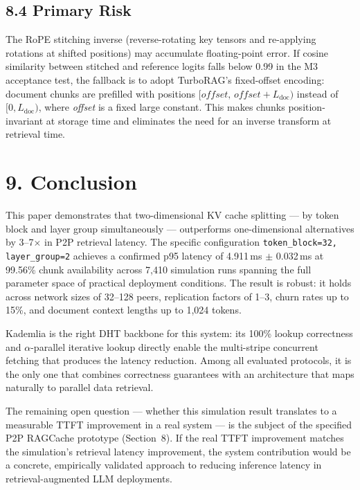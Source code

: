 \documentclass[11pt]{article}
\begin{document}
\subsection{8.4 Primary Risk}

The RoPE stitching inverse (reverse-rotating key tensors and re-applying
rotations at shifted positions) may accumulate floating-point error. If
cosine similarity between stitched and reference logits falls below 0.99
in the M3 acceptance test, the fallback is to adopt TurboRAG's
fixed-offset encoding: document chunks are prefilled with positions
$[\textit{offset},\, \textit{offset} + L_\text{doc})$ instead of
$[0, L_\text{doc})$, where \textit{offset} is a fixed large constant.
This makes chunks position-invariant at storage time and eliminates the
need for an inverse transform at retrieval time.

\section{9. Conclusion}

This paper demonstrates that two-dimensional KV cache splitting --- by
token block and layer group simultaneously --- outperforms
one-dimensional alternatives by 3--7$\times$ in P2P retrieval latency.
The specific configuration \texttt{token\_block=32, layer\_group=2}
achieves a confirmed p95 latency of 4.911\,ms $\pm$ 0.032\,ms at 99.56\%
chunk availability across 7,410 simulation runs spanning the full
parameter space of practical deployment conditions. The result is robust:
it holds across network sizes of 32--128 peers, replication factors of
1--3, churn rates up to 15\%, and document context lengths up to 1,024
tokens.

Kademlia is the right DHT backbone for this system: its 100\% lookup
correctness and $\alpha$-parallel iterative lookup directly enable the
multi-stripe concurrent fetching that produces the latency reduction.
Among all evaluated protocols, it is the only one that combines
correctness guarantees with an architecture that maps naturally to
parallel data retrieval.

The remaining open question --- whether this simulation result translates
to a measurable TTFT improvement in a real system --- is the subject of
the specified P2P RAGCache prototype (Section~8). If the real TTFT
improvement matches the simulation's retrieval latency improvement, the
system contribution would be a concrete, empirically validated approach
to reducing inference latency in retrieval-augmented LLM deployments.
\end{document}
